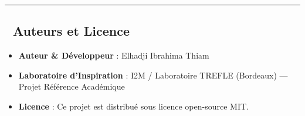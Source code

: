 \documentclass[
  french,
]{article}
\providecommand{\tightlist}{%
  \setlength{\itemsep}{0pt}\setlength{\parskip}{0pt}}
\begin{document}
\begin{center}\rule{0.5\linewidth}{0.5pt}\end{center}

\subsection{👥 Auteurs et Licence}\label{auteurs-et-licence}

\begin{itemize}
\tightlist
\item
  \textbf{Auteur \& Développeur} : Elhadji Ibrahima Thiam
\item
  \textbf{Laboratoire d'Inspiration} : I2M / Laboratoire TREFLE
  (Bordeaux) --- Projet Référence Académique
\item
  \textbf{Licence} : Ce projet est distribué sous licence open-source
  MIT.
\end{itemize}
\end{document}
